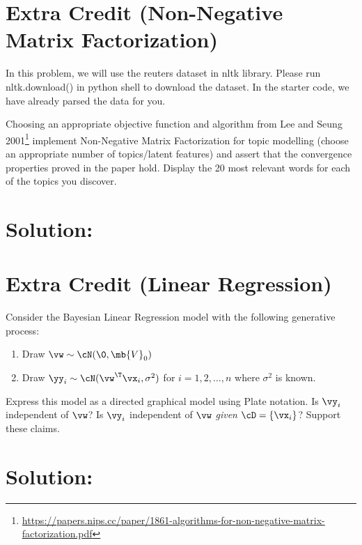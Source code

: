 \documentclass[189]{pset}
\begin{document}
  \clearpage


  \section{Extra Credit (Non-Negative Matrix Factorization)}
    In this problem, we will use the reuters dataset in nltk library.
    Please run nltk.download() in python shell to download the
    dataset. In the starter code, we have already parsed the data for
    you.

    Choosing an appropriate objective function and algorithm from Lee
    and Seung
    2001\footnote{\url{https://papers.nips.cc/paper/1861-algorithms-for-non-negative-matrix-factorization.pdf}}
    implement Non-Negative Matrix Factorization for topic modelling
    (choose an appropriate number of topics/latent features) and
    assert that the convergence properties proved in the paper hold.
    Display the 20 most relevant words for each of the topics you
    discover.

  \hrulefill

  \section*{Solution:}



  \section{Extra Credit (Linear Regression)}
    Consider the Bayesian Linear Regression model with the following
    generative process:
    \begin{enumerate}[label=\arabic*.]
      \item Draw $\vw \sim \cN(\0, \mb{V}_0)$
      \item Draw $\yy_i \sim \cN(\vw^\T\vx_i, \sigma^2)$ for
        $i=1,2,\dots,n$ where $\sigma^2$ is known.
    \end{enumerate}
    Express this model as a directed graphical model using Plate
    notation. Is $\vy_i$ independent of $\vw$? Is $\vy_i$ independent
    of $\vw$ \textit{given} $\cD = \{\vx_i\}$? Support these claims.

  \hrulefill

  \section*{Solution:}
\end{document}
